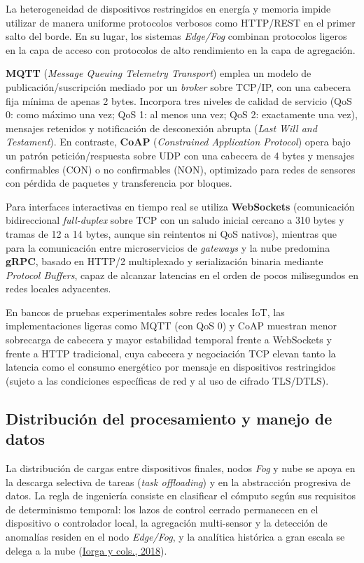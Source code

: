 \documentclass[12pt, letterpaper]{article}
\begin{document}
La heterogeneidad de dispositivos restringidos en energía y memoria impide utilizar de manera uniforme protocolos verbosos como HTTP/REST en el primer salto del borde. En su lugar, los sistemas \textit{Edge/Fog} combinan protocolos ligeros en la capa de acceso con protocolos de alto rendimiento en la capa de agregación.

\textbf{MQTT} (\textit{Message Queuing Telemetry Transport}) emplea un modelo de publicación/suscripción mediado por un \textit{broker} sobre TCP/IP, con una cabecera fija mínima de apenas 2 bytes. Incorpora tres niveles de calidad de servicio (QoS 0: como máximo una vez; QoS 1: al menos una vez; QoS 2: exactamente una vez), mensajes retenidos y notificación de desconexión abrupta (\textit{Last Will and Testament}). En contraste, \textbf{CoAP} (\textit{Constrained Application Protocol}) opera bajo un patrón petición/respuesta sobre UDP con una cabecera de 4 bytes y mensajes confirmables (CON) o no confirmables (NON), optimizado para redes de sensores con pérdida de paquetes y transferencia por bloques.

Para interfaces interactivas en tiempo real se utiliza \textbf{WebSockets} (comunicación bidireccional \textit{full-duplex} sobre TCP con un saludo inicial cercano a 310 bytes y tramas de 12 a 14 bytes, aunque sin reintentos ni QoS nativos), mientras que para la comunicación entre microservicios de \textit{gateways} y la nube predomina \textbf{gRPC}, basado en HTTP/2 multiplexado y serialización binaria mediante \textit{Protocol Buffers}, capaz de alcanzar latencias en el orden de pocos milisegundos en redes locales adyacentes.

En bancos de pruebas experimentales sobre redes locales IoT, las implementaciones ligeras como MQTT (con QoS 0) y CoAP muestran menor sobrecarga de cabecera y mayor estabilidad temporal frente a WebSockets y frente a HTTP tradicional, cuya cabecera y negociación TCP elevan tanto la latencia como el consumo energético por mensaje en dispositivos restringidos (sujeto a las condiciones específicas de red y al uso de cifrado TLS/DTLS).

\subsection{Distribución del procesamiento y manejo de datos}

La distribución de cargas entre dispositivos finales, nodos \textit{Fog} y nube se apoya en la descarga selectiva de tareas (\textit{task offloading}) y en la abstracción progresiva de datos. La regla de ingeniería consiste en clasificar el cómputo según sus requisitos de determinismo temporal: los lazos de control cerrado permanecen en el dispositivo o controlador local, la agregación multi-sensor y la detección de anomalías residen en el nodo \textit{Edge/Fog}, y la analítica histórica a gran escala se delega a la nube (\protect\hyperlink{iorga2018}{Iorga y cols., 2018}).
\end{document}
